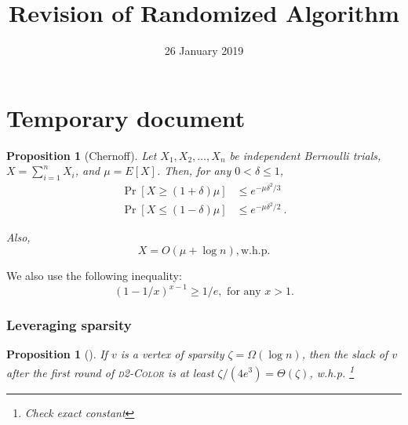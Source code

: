 \documentclass[12pt,a4]{article}
\title{Revision of Randomized Algorithm}
\author{}
\date{26 January 2019}
\newtheorem{proposition}[theorem]{Proposition}
\newcommand{\alg}[1]{\textsc{#1}}
\newcommand{\todo}[1]{\footnote{#1}}
\begin{document}
\maketitle

\section{Temporary document}


\begin{proposition}[Chernoff]
Let $X_1, X_2, \ldots, X_n$ be independent Bernoulli trials,
$X = \sum_{i=1}^n X_i$, and $\mu = E[X]$. Then, for any $0 < \delta \le 1$,
\begin{align}
\label{eq:chernoff-upper}
\Pr[X \ge (1+\delta)\mu] & \le e^{-\mu \delta^2/3}     \\
\label{eq:chernoff-lower}
\Pr[X \le (1-\delta)\mu] & \le e^{-\mu \delta^2/2}\ .
\end{align}
\iffalse
\begin{equation}
\Pr[X \ge (1+\delta)\mu] \le e^{-\mu \delta^2/3} %
\label{eq:chernoff-upper}
\end{equation}
and
\begin{equation}
\Pr[X \le (1-\delta)\mu] \le e^{-\mu \delta^2/2}\ .
\label{eq:chernoff-lower}
\end{equation}
\fi
Also,
\begin{equation}
    X = O(\mu + \log n), \text{w.h.p.}
    \label{eq:concentration}
\end{equation}
\label{prop:chernoff}
\end{proposition}

We also use the following inequality:
\begin{equation}
(1-1/x)^{x-1} \ge 1/e, \text{ for any } x > 1.
\label{eq:inv-e}
\end{equation}


\subsubsection{Leveraging sparsity} 


\begin{proposition}[\cite{EPS15}]
If $v$ is a vertex of sparsity $\zeta = \Omega(\log n)$, then the slack of $v$ after the first round of \alg{d2-Color} is at least $\zeta/(4 e^3) = \Theta(\zeta)$, w.h.p. \todo{Check exact constant}
\iffalse
Let $v$ be a vertex of sparsity $\zeta$ and let $Z$ be the slack of $v$ after the first round of \alg{d2-Color}. Then, 
\[ \Pr[Z \le \zeta/(4 e^3)] \le e^{\Omega(\zeta)}\ . \]
\fi
\label{prop:sparsity}
\end{proposition}
\end{document}
